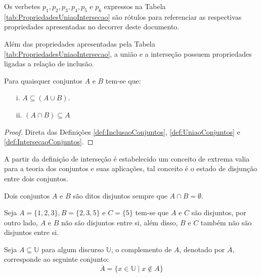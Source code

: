 \begin{dica}\label{tips:Apelidos}
  Os verbetes $p_1, p_2, p_3, p_4, p_5$ e $p_6$ expressos na Tabela \ref{tab:PropriedadesUniaoIntersecao} são rótulos para referenciar as respectivas propriedades apresentadas no decorrer deste documento.
\end{dica}

Além das propriedades apresentadas pela Tabela \ref{tab:PropriedadesUniaoIntersecao}, a união e a interseção possuem propriedades ligadas a relação de inclusão.

\begin{teorema}\label{teo:MonotonicidadeDaUniaoIntersecao}
	Para quaisquer conjuntos $A$ e $B$ tem-se que:
	\begin{itemize}
		\item[i.] $A \subseteq (A \cup B)$.
		\item[ii.] $(A \cap B) \subseteq A$
	\end{itemize}
\end{teorema}

\begin{proof}
	Direta das Definições \ref{def:InclusaoConjuntos}, \ref{def:UniaoConjuntos} e \ref{def:IntersecaoConjuntos}.
\end{proof}

A partir da definição de interseção é estabelecido um conceito de extrema valia para a teoria dos conjuntos e suas aplicações, tal conceito é o estado de disjunção entre dois conjuntos.

\begin{definicao}\label{def:ConjuntosDisjuntos}
	Dois conjuntos $A$ e $B$ são ditos disjuntos sempre que $A \cap B = \emptyset$.
\end{definicao}

\begin{exemplo}\label{exe:ConjuntosDisjuntos}
	Seja $A = \{1, 2, 3\}, B = \{2, 3, 5\}$ e $C = \{5\}$ tem-se que $A$ e $C$ são disjuntos, por outro lado, $A$ e $B$ não são disjuntos entre si, além disso, $B$ e $C$ também não são disjuntos entre si.
\end{exemplo}

\begin{definicao}\label{def:ComplementoConjuntos}
	Seja $A \subseteq \mathbb{U}$ para algum discurso $\mathbb{U}$, o complemento de $A$, denotado por $\overline{A}$, corresponde ao seguinte conjunto:
	$$\overline{A} = \{x \in \mathbb{U} \mid x \notin A\}$$
\end{definicao}

